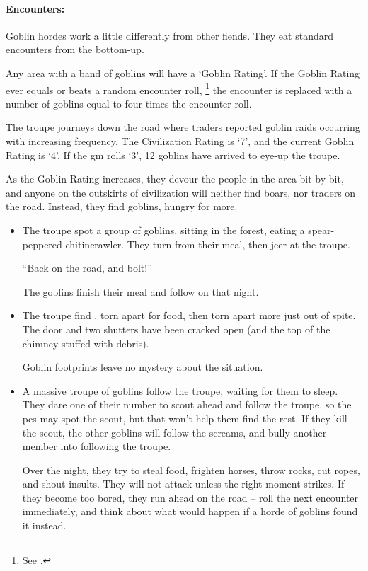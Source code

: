 \begin{multicols}{2}
\paragraph{Encounters:}

Goblin hordes work a little differently from other fiends.
They eat standard encounters from the bottom-up.

Any area with a band of goblins will have a `Goblin Rating'.
If the Goblin Rating ever equals or beats a random encounter roll,%
\footnote{See .}
the encounter is replaced with a number of goblins equal to four times the encounter roll.

\begin{exampletext}
  The troupe journeys down the road where traders reported goblin raids occurring with increasing frequency.
  The Civilization Rating is `7', and the current Goblin Rating is `4'.
  If the \gls{gm} rolls `3', 12 goblins have arrived to eye-up the troupe.
\end{exampletext}

As the Goblin Rating increases, they devour the people in the area bit by bit, and anyone on the outskirts of civilization will neither find boars, nor traders on the road.
Instead, they find goblins, hungry for more.


\begin{itemize}
  \item
  The troupe spot a group of goblins, sitting in the forest, eating a spear-peppered chitincrawler.
  They turn from their meal, then jeer at the troupe.

  ``Back on the road, and bolt!''

  The goblins finish their meal and follow on that night.
  \item
  The troupe find , torn apart for food, then torn apart more just out of spite.
  The door and two shutters have been cracked open (and the top of the chimney stuffed with debris).

  Goblin footprints leave no mystery about the situation.
  \item
  A massive troupe of goblins follow the troupe, waiting for them to sleep.
  They dare one of their number to scout ahead and follow the troupe, so the \glspl{pc} may spot the scout, but that won't help them find the rest.
  If they kill the scout, the other goblins will follow the screams, and bully another member into following the troupe.

  Over the night, they try to steal food, frighten horses, throw rocks, cut ropes, and shout insults.
  They will not attack unless the right moment strikes.
  If they become too bored, they run ahead on the road -- roll the next encounter immediately, and think about what would happen if a horde of goblins found it instead.
\end{itemize}

\end{multicols}

